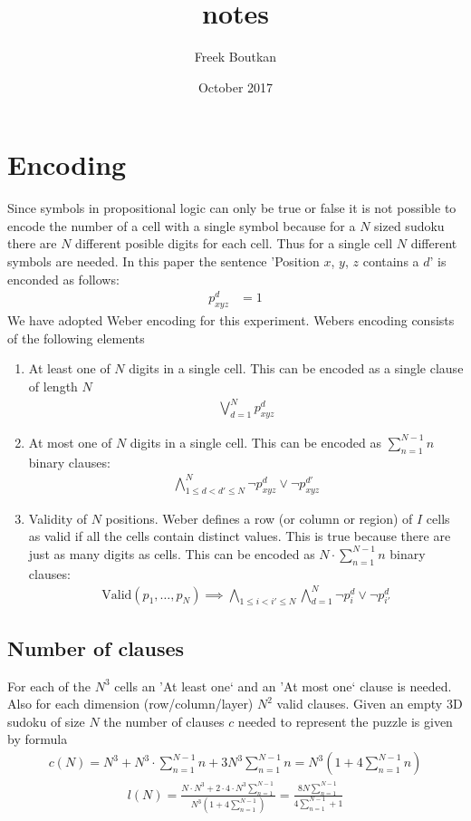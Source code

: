 \documentclass{article}
\title{notes}
\author{Freek Boutkan}
\date{October 2017}
\begin{document}
\section{Encoding}
Since symbols in propositional logic can only be true or false it is not possible to encode the number of a cell with a single symbol because for a $N$ sized sudoku there are $N$ different posible digits for each cell. Thus for a single cell $N$ different symbols are needed. In this paper the sentence 'Position $x$, $y$, $z$ contains a $d$' is enconded as follows:
\begin{align}
p_{xyz}^d &= 1
\end{align}
We have adopted Weber encoding for this experiment. Webers encoding consists of the following elements
\begin{enumerate}
\item At least one of $N$ digits in a single cell. This can be encoded as a single clause of length $N$
\begin{align}
\bigvee_{d=1}^N p_{xyz}^d
\end{align}
\item At most one of $N$ digits in a single cell. This can be encoded as $\sum_{n=1}^{N-1}n$ binary clauses:
\begin{align}
\bigwedge_{1 \leq d < d' \leq N}^N \neg p_{xyz}^d \vee \neg p_{xyz}^{d'}
\end{align}
\item Validity of $N$ positions. Weber defines a row (or column or region) of $I$ cells as valid if all the cells contain distinct values. This is true because there are just as many digits as cells. This can be encoded as $N \cdot \sum_{n=1}^{N-1}n$ binary clauses:
\begin{align}
\text{Valid}(p_1,\dots,p_N) \implies \bigwedge_{1 \leq i < i' \leq N}\bigwedge_{d=1}^N \neg p_{i}^d \vee \neg p_{i'}^{d}
\end{align}
\end{enumerate}

\subsection{Number of clauses}
For each of the $N^3$ cells an 'At least one` and an 'At most one` clause is needed. Also for each dimension (row/column/layer) $N^2$ valid clauses.
Given an empty 3D sudoku of size $N$ the number of clauses $c$ needed to represent the puzzle is given by formula
\begin{align}
c(N) = N^3 + N^3 \cdot \sum_{n=1}^{N-1}n + 3N^3\sum_{n=1}^{N-1}n = N^3(1 + 4\sum_{n=1}^{N-1}n)
\end{align}
\begin{align}
l(N) = \frac{N\cdot N^3 + 2\cdot4\cdot N^3 \sum_{n=1}^{N-1}}{N^3(1 + 4\sum_{n=1}^{N-1})} = \frac{8N\sum_{n=1}^{N-1}}{4\sum_{n=1}^{N-1}+1}
\end{align}
\end{document}
